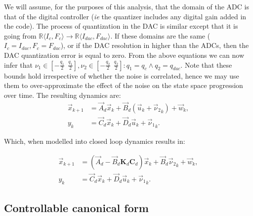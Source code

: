 \documentclass[runningheads,a4paper]{llncs}
\newcommand{\mat}[1]{\boldsymbol{#1}}
\begin{document}
We will assume, for the purposes of this analysis, that the domain of the ADC is that of the digital controller (\emph{ie} the quantizer includes any digital gain added in the code).
The process of quantization in the DAC is similar except that it is going from $\mathbb{R}\langle I_{c},F_{c} \rangle \rightarrow \mathbb{R}\langle I_{dac},F_{dac} \rangle$. If these domains are the same ($I_{c}=I_{dac},F_{c}=F_{dac}$), or if the DAC resolution in higher than the ADCs, then the DAC quantization error is equal to zero.
From the above equations we can now infer that $\nu_1 \in [-\frac{q_1}{2}\ \ \frac{q_1}{2}], \nu_2 \in [-\frac{q_2}{2}\ \ \frac{q_2}{2}] : q_1=q_{c} \wedge q_2=q_{dac}$.
Note that these bounds hold irrespective of whether the noise is correlated, hence we may use them to over-approximate the effect of the noise on the state space progression over time.
The resulting dynamics are:
\begin{align}
\label{eq:pre_quantization}
\vec{x}_{k+1} &= \vec{A}_d\vec{x}_k+\vec{B}_d(\vec{u}_k+{\vec{\nu}_2}_k) + \vec{w}_k,\\
y_k &= \vec{C}_d \vec{x}_ k + \vec{D}_d \vec{u}_ k+{\vec{\nu}_1}_k. 
\end{align}

Which, when modelled into closed loop dynamics results in:

\begin{align}
\label{eq:quantization}
\vec{x}_{k+1} &= (\vec{A}_d-\vec{B}_d\mat{K}_d\mat{C}_d) \vec{x}_k+\vec{B}_d{\vec{\nu}_2}_k + \vec{w}_k,\\
y_k &= \vec{C}_d \vec{x}_ k + \vec{D}_d \vec{u}_ k+{\vec{\nu}_1}_k. 
\end{align}

\subsection{Controllable canonical form} \label{sec:reachable}
\end{document}
